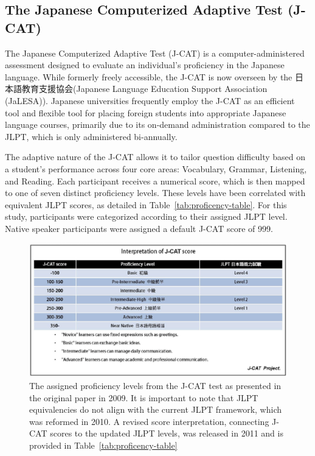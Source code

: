 \subsection{The Japanese Computerized Adaptive Test (J-CAT)}
\label{j-cat}


The Japanese Computerized Adaptive Test (J-CAT) \citep{Imai2009} is a computer-administered assessment
designed to evaluate an
individual's proficiency in the Japanese language. While formerly freely accessible, the J-CAT is now overseen by
the  日本語教育支援協会(Japanese Language Education Support Association (JaLESA)). Japanese
universities frequently
employ the J-CAT as an efficient tool and flexible tool for placing foreign students into appropriate Japanese
language courses, primarily due to its on-demand administration compared to the JLPT, which is only
administered bi-annually.

The adaptive nature of the J-CAT allows it to tailor question difficulty based on a student's performance across
four core areas: Vocabulary, Grammar, Listening, and Reading. Each participant receives a numerical score, which is
then mapped to one of seven distinct proficiency levels. These levels have been correlated with equivalent JLPT
scores, as detailed in Table~\ref{tab:proficency-table}. For this study, participants were categorized according to
their
assigned JLPT level. Native speaker participants were assigned a default J-CAT score of 999.

\begin{figure}[h!]
    \centering
    \includegraphics[scale=.3]{img/JCatScores.png}
    \caption[J-CAT Score Interpretation]{The assigned proficiency levels from the J-CAT test as presented in the original paper in  2009. It is
    important to note that JLPT equivalencies do not align with the current JLPT framework, which was reformed in 2010. A revised score interpretation, connecting J-CAT scores to the updated JLPT levels, was released in 2011 and is provided in Table~\ref{tab:proficency-table} }
    \label{fig:JCatLevels}
\end{figure}


